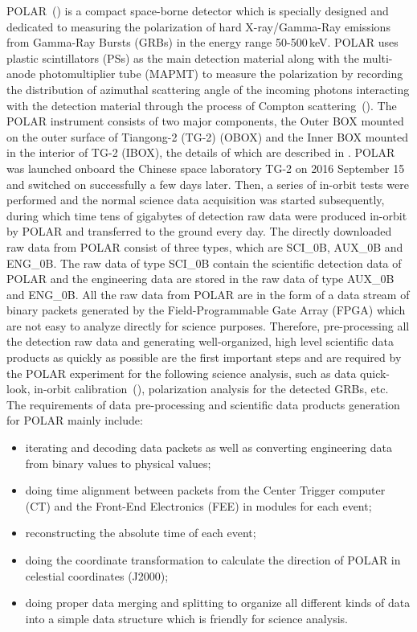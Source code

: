 \documentclass{raa}
\begin{document}
POLAR~(\citealt{PRODUIT2005616}) is a compact space-borne detector which is specially designed and dedicated to measuring the polarization of hard X-ray/Gamma-Ray emissions from Gamma-Ray Bursts (GRBs) in the energy range 50-500\,keV. POLAR uses plastic scintillators (PSs) as the main detection material along with the multi-anode photomultiplier tube (MAPMT) to measure the polarization by recording the distribution of azimuthal scattering angle of the incoming photons interacting with the detection material through the process of Compton scattering~(\citealt{Xiong2009}). The POLAR instrument consists of two major components, the Outer BOX mounted on the outer surface of Tiangong-2 (TG-2) (OBOX) and the Inner BOX mounted in the interior of TG-2 (IBOX), the details of which are described in \citealt{Produit2017}. POLAR was launched onboard the Chinese space laboratory TG-2 on 2016 September 15 and switched on successfully a few days later. Then, a series of in-orbit tests were performed and the normal science data acquisition was started subsequently, during which time tens of gigabytes of detection raw data were produced in-orbit by POLAR and transferred to the ground every day. The directly downloaded raw data from POLAR consist of three types, which are SCI\_0B, AUX\_0B and ENG\_0B. The raw data of type SCI\_0B contain the scientific detection data of POLAR and the engineering data are stored in the raw data of type AUX\_0B and ENG\_0B. All the raw data from POLAR are in the form of a data stream of binary packets generated by the Field-Programmable Gate Array (FPGA) which are not easy to analyze directly for science purposes. Therefore, pre-processing all the detection raw data and generating well-organized, high level scientific data products as quickly as possible are the first important steps and are required by the POLAR experiment for the following science analysis, such as data quick-look, in-orbit calibration~(\citealt{LI20188}), polarization analysis for the detected GRBs, etc. The requirements of data pre-processing and scientific data products generation for POLAR mainly include:
\begin{itemize}
\item iterating and decoding data packets as well as converting engineering data from binary values to physical values;
\item doing time alignment between packets from the Center Trigger computer (CT) and the Front-End Electronics (FEE) in modules for each event;
\item reconstructing the absolute time of each event;
\item doing the coordinate transformation to calculate the direction of POLAR in celestial coordinates (J2000);
\item doing proper data merging and splitting to organize all different kinds of data into a simple data structure which is friendly for science analysis.
\end{itemize}
\end{document}
